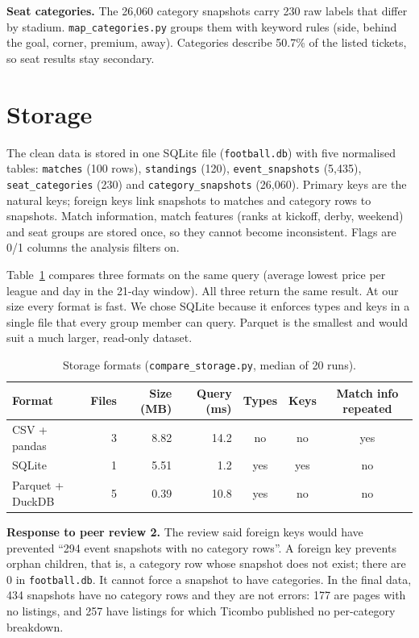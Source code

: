 \documentclass[11pt,a4paper]{article}
\begin{document}
\textbf{Seat categories.} The 26,060 category snapshots carry 230 raw labels that differ by stadium. \texttt{map\_categories.py} groups them with keyword rules (side, behind the goal, corner, premium, away). Categories describe 50.7\% of the listed tickets, so seat results stay secondary.

\section{Storage}

The clean data is stored in one SQLite file (\texttt{football.db}) with five normalised tables: \texttt{matches} (100 rows), \texttt{standings} (120), \texttt{event\_snapshots} (5,435), \texttt{seat\_categories} (230) and \texttt{category\_snapshots} (26,060). Primary keys are the natural keys; foreign keys link snapshots to matches and category rows to snapshots. Match information, match features (ranks at kickoff, derby, weekend) and seat groups are stored once, so they cannot become inconsistent. Flags are 0/1 columns the analysis filters on.

Table~\ref{tab:storage} compares three formats on the same query (average lowest price per league and day in the 21-day window). All three return the same result. At our size every format is fast. We chose SQLite because it enforces types and keys in a single file that every group member can query. Parquet is the smallest and would suit a much larger, read-only dataset.

\begin{table}[htbp]
\centering
\caption{Storage formats (\texttt{compare\_storage.py}, median of 20 runs).}
\label{tab:storage}
\begin{tabular}{lrrrccc}
\toprule
Format & Files & Size (MB) & Query (ms) & Types & Keys & Match info repeated \\
\midrule
CSV + pandas & 3 & 8.82 & 14.2 & no & no & yes \\
SQLite & 1 & 5.51 & 1.2 & yes & yes & no \\
Parquet + DuckDB & 5 & 0.39 & 10.8 & yes & no & no \\
\bottomrule
\end{tabular}
\end{table}

\textbf{Response to peer review 2.} The review said foreign keys would have prevented ``294 event snapshots with no category rows''. A foreign key prevents orphan children, that is, a category row whose snapshot does not exist; there are 0 in \texttt{football.db}. It cannot force a snapshot to have categories. In the final data, 434 snapshots have no category rows and they are not errors: 177 are pages with no listings, and 257 have listings for which Ticombo published no per-category breakdown.
\end{document}
